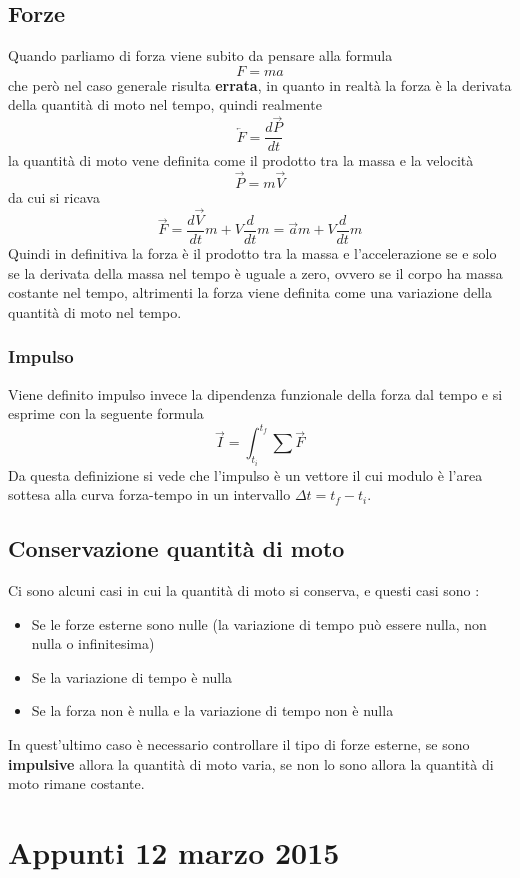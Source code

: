 \documentclass[portait]{article}
\begin{document}
\subsection{Forze}
Quando parliamo di forza viene subito da pensare alla formula 
$$F = ma$$
che però nel caso generale risulta \textbf{errata}, in quanto in realtà la forza è la derivata della quantità di moto nel tempo, quindi realmente 
$$\overleftarrow{F} = \frac{d \overrightarrow{P}}{dt}$$
la quantità di moto vene definita come il prodotto tra la massa e  la velocità
$$\overrightarrow{P} = m\overrightarrow{V}$$
da cui si ricava 
$$\overrightarrow{F} = \frac{d\overrightarrow{V}}{dt}m + V\frac{d}{dt}m = \overrightarrow{a}m + V\frac{d}{dt}m$$
Quindi in definitiva la forza è il prodotto tra la massa e l'accelerazione se e solo se la derivata della massa nel tempo è uguale a zero, ovvero se il corpo ha massa costante nel tempo, altrimenti la forza viene definita come una variazione della quantità di moto nel tempo.
\subsubsection{Impulso}
Viene definito impulso invece la dipendenza funzionale della forza dal tempo e si esprime con la seguente formula
$$\overrightarrow{I} = \int_{t_i}^{t_f} \sum \overrightarrow{F}$$
Da questa definizione si vede che l'impulso è un vettore il cui modulo è l'area sottesa alla curva forza-tempo in un intervallo $\Delta t = t_f - t_i$.
\subsection{Conservazione quantità di moto}
Ci sono alcuni casi in cui la quantità di moto si conserva, e questi casi sono :
\begin{itemize}
\item Se le forze esterne sono nulle (la variazione di tempo può essere nulla, non nulla o infinitesima)
\item Se la variazione di tempo è nulla
\item Se la forza non è nulla e la variazione di tempo non è nulla
\end{itemize}
In quest'ultimo caso è necessario controllare il tipo di forze esterne, se sono \textbf{impulsive} allora la quantità di moto varia, se non lo sono allora la quantità di moto rimane costante.
\section{Appunti 12 marzo 2015}
\end{document}
